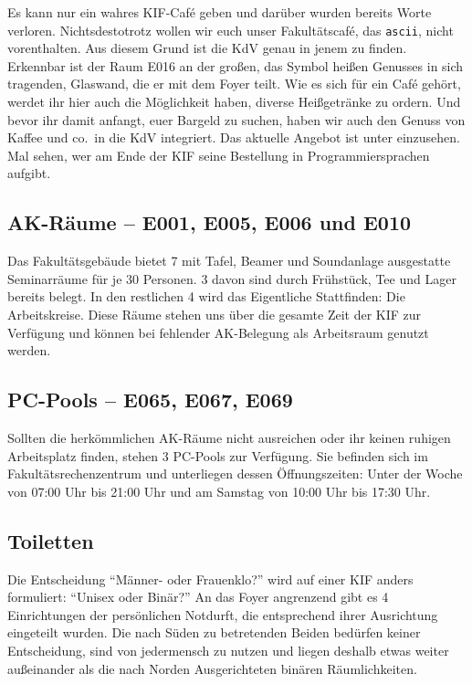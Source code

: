 Es kann nur ein wahres KIF-Café geben und darüber wurden bereits Worte verloren.
Nichtsdestotrotz wollen wir euch unser Fakultätscafé, das \texttt{ascii}, nicht vorenthalten.
Aus diesem Grund ist die KdV genau in jenem zu finden.
Erkennbar ist der Raum E016 an der großen, das Symbol heißen Genusses in sich tragenden, Glaswand, die er mit dem Foyer teilt.
Wie es sich für ein Café gehört, werdet ihr hier auch die Möglichkeit haben, diverse Heißgetränke zu ordern.
Und bevor ihr damit anfangt, euer Bargeld zu suchen, haben wir auch den Genuss von Kaffee und co.\ in die KdV integriert.
Das aktuelle Angebot ist unter  einzusehen.
Mal sehen, wer am Ende der KIF seine Bestellung in Programmiersprachen aufgibt.


\subsection*{AK-Räume -- E001, E005, E006 und E010}
Das Fakultätsgebäude bietet 7 mit Tafel, Beamer und Soundanlage ausgestatte Seminarräume für je 30 Personen.
3 davon sind durch Frühstück, Tee und Lager bereits belegt.
In den restlichen 4 wird das Eigentliche Stattfinden: Die Arbeitskreise.
Diese Räume stehen uns über die gesamte Zeit der KIF zur Verfügung und können bei fehlender AK-Belegung als Arbeitsraum genutzt werden.

\subsection*{PC-Pools -- E065, E067, E069}
Sollten die herkömmlichen AK-Räume nicht ausreichen oder ihr keinen ruhigen Arbeitsplatz finden, stehen 3 PC-Pools zur Verfügung.
Sie befinden sich im Fakultätsrechenzentrum und unterliegen dessen Öffnungszeiten:
Unter der Woche von 07:00 Uhr bis 21:00 Uhr und am Samstag von 10:00 Uhr bis 17:30 Uhr.

\subsection*{Toiletten}
Die Entscheidung \enquote{Männer- oder Frauenklo?} wird auf einer KIF anders formuliert: \enquote{Unisex oder Binär?}
An das Foyer angrenzend gibt es 4 Einrichtungen der persönlichen Notdurft, die entsprechend ihrer Ausrichtung eingeteilt wurden.
Die nach Süden zu betretenden Beiden bedürfen keiner Entscheidung, sind von jedermensch zu nutzen und liegen deshalb etwas weiter außeinander als die nach Norden Ausgerichteten binären Räumlichkeiten.

